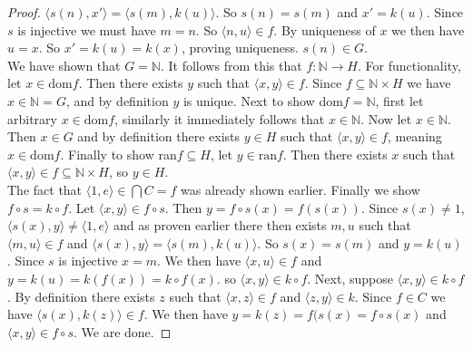\documentclass{report}
\begin{document}
\begin{proof}
$\langle s(n),x'\rangle=\langle s(m),k(u)\rangle$. So $s(n)=s(m)$ and $x'=k(u)$. Since $s$ is injective we must have $m=n$. So $\langle n,u\rangle\in f$. By uniqueness of $x$ we then have
$u=x$. So $x'=k(u)=k(x)$, proving uniqueness. $s(n)\in G$.\\
\indent We have shown that $G=\mathbb N$. It follows from this that $f:\mathbb N\to H$. For functionality, let $x\in\text{dom}f$. Then there exists $y$ such that $\langle x,y\rangle\in f$.
Since $f\subseteq\mathbb N\times H$ we have $x\in\mathbb N=G$, and by definition $y$ is unique.
Next to show dom$f=\mathbb N$, first let arbitrary $x\in\text{dom}f$, similarly it immediately follows that $x\in\mathbb N$. Now let $x\in\mathbb N$. Then $x\in G$ and by definition there exists
$y\in H$ such that $\langle x,y\rangle\in f$, meaning $x\in\text{dom}f$. Finally to show ran$f\subseteq H$, let $y\in\text{ran}f$. 
Then there exists $x$ such that $\langle x,y\rangle\in f\subseteq\mathbb N\times H$, so $y\in H$.\\
\indent The fact that $\langle 1,e\rangle\in\bigcap C=f$ was already shown earlier. 
Finally we show $f\circ s=k\circ f$. Let $\langle x,y\rangle\in f\circ s$. Then $y=f\circ s(x)=f(s(x))$. Since $s(x)\neq 1$, $\langle s(x),y\rangle\neq\langle 1,e\rangle$ and as proven
earlier there then exists $m,u$ such that $\langle m,u\rangle\in f$ and $\langle s(x),y\rangle=\langle s(m),k(u)\rangle$. So $s(x)=s(m)$ and $y=k(u)$.
Since $s$ is injective $x=m$. We then have $\langle x,u\rangle\in f$ and $y=k(u)=k(f(x))=k\circ f(x)$. so $\langle x,y\rangle\in k\circ f$.
Next, suppose $\langle x,y\rangle\in k\circ f$.
By definition there exists $z$ such that $\langle x,z\rangle\in f$ and $\langle z,y\rangle\in k$.
Since $f\in C$ we have $\langle s(x),k(z)\rangle\in f$. We then have $y=k(z)=f(s(x)=f\circ s(x)$ and
$\langle x,y\rangle\in f\circ s$. We are done.
\end{proof}
\newpage
\end{document}
